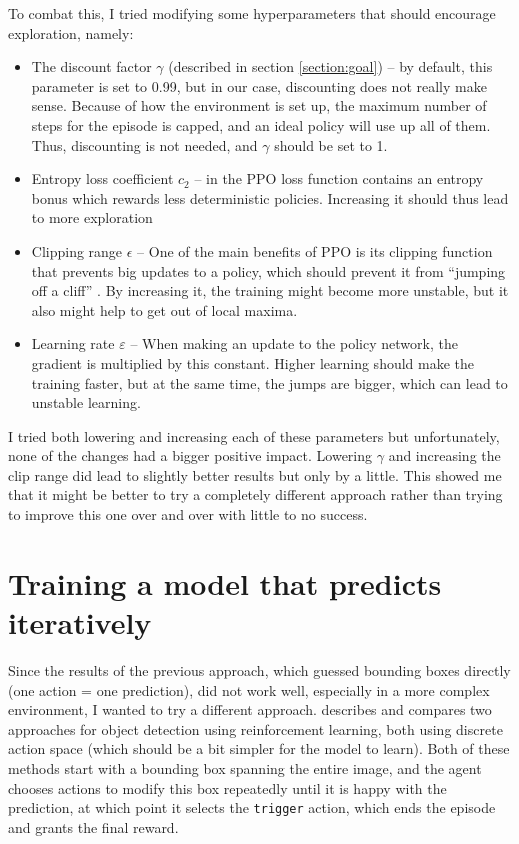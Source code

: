 \documentclass[
  digital,     %
  oneside,     %
  nosansbold,  %
  nocolorbold, %
  lof,         %
  lot,         %
]{fithesis4}
\begin{document}
To combat this, I tried modifying some hyperparameters that should encourage exploration, namely:
\begin{itemize}
    \item The discount factor $\gamma$ (described in section \ref{section:goal}) -- by default, this parameter is set to 0.99, but in our case, discounting does not really make sense. Because of how the environment is set up, the maximum number of steps for the episode is capped, and an ideal policy will use up all of them. Thus, discounting is not needed, and $\gamma$ should be set to 1.
    \item Entropy loss coefficient $c_2$ -- in the PPO loss function contains an entropy bonus which rewards less deterministic policies. Increasing it should thus lead to more exploration \cite{PPO_paper}
    \item Clipping range $\epsilon$ -- One of the main benefits of PPO is its clipping function that prevents big updates to a policy, which should prevent it from \enquote{jumping off a cliff} \cite{PPO_paper}. By increasing it, the training might become more unstable, but it also might help to get out of local maxima.
    \item Learning rate $\varepsilon$ -- When making an update to the policy network, the gradient is multiplied by this constant. Higher learning should make the training faster, but at the same time, the jumps are bigger, which can lead to unstable learning.
\end{itemize}

I tried both lowering and increasing each of these parameters but unfortunately, none of the changes had a bigger positive impact. Lowering $\gamma$ and increasing the clip range did lead to slightly better results but only by a little. This showed me that it might be better to try a completely different approach rather than trying to improve this one over and over with little to no success.

\chapter{Training a model that predicts iteratively}
\label{chap:iterative}

Since the results of the previous approach, which guessed bounding boxes directly (one action = one prediction), did not work well, especially in a more complex environment, I wanted to try a different approach. \cite{rl_object_detection} describes and compares two approaches for object detection using reinforcement learning, both using discrete action space (which should be a bit simpler for the model to learn). Both of these methods start with a bounding box spanning the entire image, and the agent chooses actions to modify this box repeatedly until it is happy with the prediction, at which point it selects the \texttt{trigger} action, which ends the episode and grants the final reward.
\end{document}
